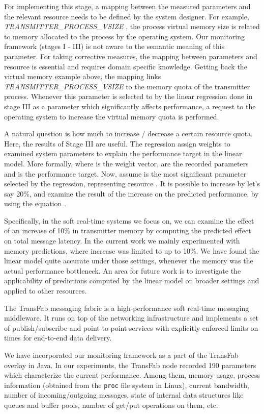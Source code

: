 \documentclass[times, 10pt,twocolumn]{article}
\begin{document}
For implementing this stage, a mapping between the measured parameters and the relevant resource needs to be
defined by the system designer. For example, {\em TRANSMITTER\_PROCESS\_VSIZE }, the process virtual memory size is related
to memory allocated to the process by the operating system. Our monitoring framework (stages I - III) is not aware to the semantic meaning of this parameter. For taking corrective measures, the mapping between parameters
and resource is essential and requires domain specific knowledge. Getting back the virtual memory example above,
the mapping links {\em TRANSMITTER\_PROCESS\_VSIZE} to the memory quota of the transmitter process. Whenever 
this parameter is selected to by the linear regression done in stage III as a parameter which significantly
affects performance, a request to the operating system to increase the virtual memory quota is performed. 

A natural question is how much to increase / decrease a certain resource quota. Here, the results of Stage III are useful. The regression assign weights to examined system parameters to explain the performance target in the linear model. More formally,  where  is the weight vector,  are the recorded parameters and  is the performance target. Now, assume  is the most significant parameter selected by the regression, representing resource . It is possible to increase  by let's say 20\%,  and examine the result of the increase on the predicted performance, by using the equation .

Specifically, in the soft real-time systems we focus on, we can examine the effect of an increase of 10\% in transmitter memory by computing the predicted effect on total message latency. In the current work we
mainly experimented with memory predictions, where increase was limited to up to 10\%. We have found the linear
model quite accurate under those settings, whenever the memory was the actual performance bottleneck. An area for future work is to investigate the applicability of predictions computed by the linear model on broader settings and applied to other resources.

\label{sec:exp}
The TransFab messaging fabric is a high-performance soft real-time messaging middleware.
It runs on top of the networking infrastructure and implements a set of publish/subscribe and point-to-point services
with explicitly enforced limits on times for end-to-end data delivery. 

We have incorporated our monitoring framework as a part of the TransFab overlay in Java.
In our experiments, the TransFab node recorded 190 parameters which characterize the current performance. Among them, memory usage, process information (obtained from the {\tt proc} file system in Linux), current bandwidth, number of incoming/outgoing messages, state of internal data structures like queues and buffer pools, number of get/put operations on them, etc.
\end{document}
